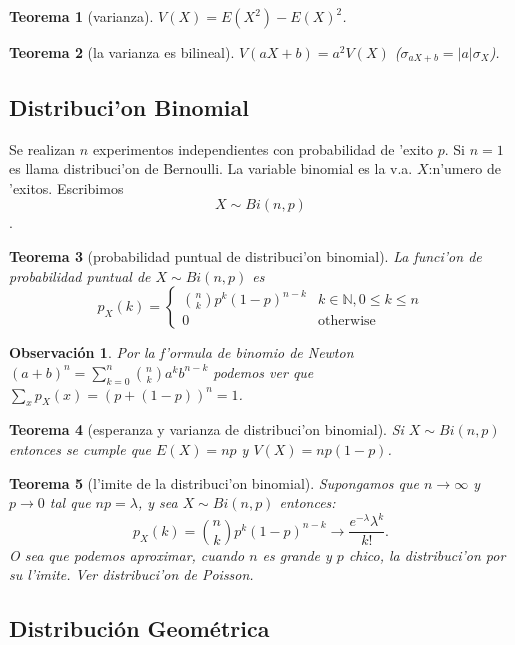 \documentclass[a4paper,spanish]{article}
\newcommand{\N}[0]{\mathbb{N}}
\newtheorem{teo}{Teorema}
\newtheorem{obs}{Observaci\'on}
\begin{document}
\begin{teo}[varianza]
$V(X) = E(X^2) - E(X)^2$.
\end{teo}

\begin{teo}[la varianza es bilineal]
$V(aX+b) = a^2 V(X)$ ($\sigma_{aX+b} = |a|\sigma_X$).
\end{teo}

\subsection{Distribuci'on Binomial}

Se realizan $n$ experimentos independientes con probabilidad de 'exito $p$. Si
$n=1$ es llama distribuci'on de Bernoulli. La variable binomial es la v.a. 
$X$:n'umero de 'exitos. Escribimos 
$$X \sim Bi(n,p)$$.

\begin{teo}[probabilidad puntual de distribuci'on binomial]
La funci'on de probabilidad puntual de $X \sim Bi(n,p)$ es 
$$p_X(k) = 
	\begin{cases}
		{n \choose k}p^k(1-p)^{n-k} & k \in \N, 0 \leq k \leq n \\
		0 & \mbox{otherwise}
	\end{cases}
$$
\end{teo}

\begin{obs}
Por la f'ormula de binomio de Newton $(a+b)^n = 
	\sum_{k=0}^n {n \choose k} a^k b^{n-k}$ podemos ver que 
$\sum_x p_X(x) = (p + (1-p))^n = 1$.
\end{obs}

\begin{teo}[esperanza y varianza de distribuci'on binomial]
Si $X \sim Bi(n,p)$ entonces se cumple que $E(X) = np$ y $V(X) = np(1-p)$.
\end{teo}

\begin{teo}[l'imite de la distribuci'on binomial]
Supongamos que $n \to \infty$ y $p \to 0$ tal que 
$np = \lambda$, y sea $X \sim Bi(n,p)$ entonces:
$$p_X(k) = {n \choose k}p^k(1-p)^{n-k} \longrightarrow 
	\frac{e^{-\lambda} \lambda^k}{k!}.$$
O sea que podemos aproximar, cuando $n$ es grande y $p$ chico, la distribuci'on
por su l'imite. Ver distribuci'on de Poisson.
\end{teo}

\subsection{Distribuci\'on Geom\'etrica}
\end{document}

